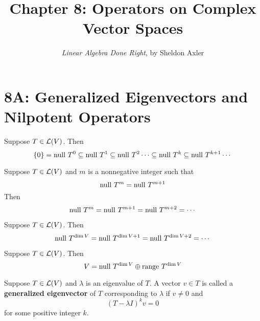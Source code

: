 \documentclass{extarticle}
\title{\vspace{-2em}Chapter 8: Operators on Complex Vector Spaces}
\author{\emph{Linear Algebra Done Right}, by Sheldon Axler}
\date{}
\begin{document}
\maketitle 
\tableofcontents

\newpage 




\newpage 
\section*{8A: Generalized Eigenvectors and Nilpotent Operators}


\begin{lemma}
    Suppose \(T \in \mathcal{L}(V)\). Then 
    \[\{0\} = \text{null } T^0 \subseteq \text{null } T^1 
    \subseteq \text{null } T^2 \cdots \subseteq \text{null } T^k 
    \subseteq \text{null } T^{k+1} \cdots\]
\end{lemma}

\begin{lemma}
    Suppose \(T \in \mathcal{L}(V)\) and \(m\) is a nonnegative 
    integer such that 
    \[\text{null } T^m = \text{null } T^{m+1}\]
    Then 
    \[\text{null } T^{m} = \text{null } T^{m+1} = \text{null } T^{m+2} = \cdots\]
\end{lemma}

\begin{lemma}
    Suppose \(T \in \mathcal{L}(V)\). Then 
    \[\text{null } T^{\dim V} = \text{null } T^{\dim V + 1} = \text{null } T^{\dim V + 2} = \cdots\]
\end{lemma}

\begin{thm}
    Suppose \(T \in \mathcal{L}(V)\). Then 
    \[V = \text{null } T^{\dim V} \oplus \text{range } T^{\dim V}\]
\end{thm}

\begin{definition}
    Suppose \(T \in \mathcal{L}(V)\) and \(\lambda\) is an eigenvalue 
    of \(T\). A vector \(v \in T\) is called a 
    \textbf{generalized eigenvector} of \(T\) corresponding
    to \(\lambda\) if \(v \neq 0\) and 
    \[(T - \lambda I)^k v = 0\]
    for some positive integer \(k\).
\end{definition}
\end{document}
